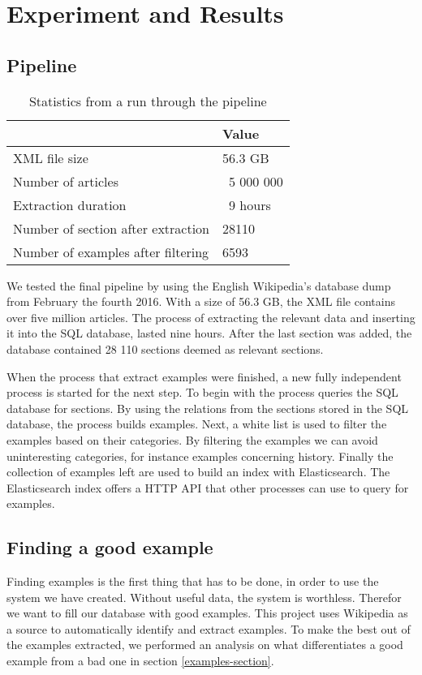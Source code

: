 
\chapter{Experiment and Results}

\section{Pipeline}
\begin{table}[h!]
\centering
\begin{tabular} {|| p{20em} | p{5em} ||} 
 \hline
  & Value \\ [0.5ex] 
 \hline
XML file size & 56.3 GB \\
Number of articles & ~5 000 000 \\
Extraction duration & ~9 hours \\
Number of section after extraction & 28110 \\
Number of examples after filtering & 6593 \\

 \hline
\end{tabular}
\caption{Statistics from a run through the pipeline}
\label{table:run_statistics}
\end{table}


We tested the final pipeline by using the English Wikipedia's database dump from February the fourth 2016. With a size of 56.3 GB, the XML file contains over five million articles. The process of extracting the relevant data and inserting it into the SQL database, lasted nine hours. After the last section was added, the database contained 28 110 sections deemed as relevant sections.

When the process that extract examples were finished, a new fully independent process is started for the next step. To begin with the process queries the SQL database for sections. By using the relations from the sections stored in the SQL database, the process builds examples. Next, a white list is used to filter the examples based on their categories. By filtering the examples we can avoid uninteresting categories, for instance examples concerning history. Finally the collection of examples left are used to build an index with Elasticsearch. The Elasticsearch index offers a HTTP API that other processes can use to query for examples.


\section{Finding a good example}
Finding examples is the first thing that has to be done, in order to use the system we have created. Without useful data, the system is worthless. Therefor we want to fill our database with good examples. This project uses Wikipedia as a source to automatically identify and extract examples. To make the best out of the examples extracted, we performed an analysis on what differentiates a good example from a bad one in section \ref{examples-section}.

